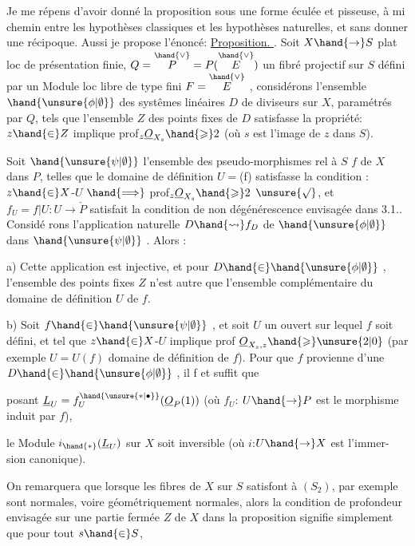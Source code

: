 \placedmargin{$|$}
Je me répens d'avoir donné la proposition  sous une forme éculée et
pisseuse, à mi chemin entre  les hypothèses classiques et les hypothèses
naturelles, et sans donner une récipoque. Aussi je propose l'énoncé:
\uline{Proposition. }.  Soit $X \hand{\to} S$ plat loc de présentation
finie,  $Q=\overset{\hand{\vee}}{P} = P(\overset{\hand{\vee}}{E})$  un fibré  projectif sur $S$ défini par
un Module loc  libre de type fini $F = \overset{\hand{\vee}}{E}$ ,  considérons l'ensemble
$\hand{\unsure{\phi|\emptyset}}$  des systêmes linéaires $D$  de diviseurs  sur $X$, paramétrés par $Q$, tels
que l'ensemble  $Z$ des points fixes de $D$  satisfasse la propriété: $z \hand{\in} Z$
implique prof$_z \underline{O}_{X_s} \hand{\geqslant} 2$  (où  $s$  est l'image de $z$ dans $S$). 

  Soit $\hand{\unsure{\psi|\emptyset}}$ l'ensemble des  pseudo-morphismes rel à
$S$ $f$ de $X$ dans  $P$, telles que le domaine de définition $U=$(f)
 satisfasse la condition : $z \hand{\in} X$-$U$ $\hand{\Longrightarrow}$ prof$_z \underline{O}_{X_s} \hand{\geqslant} 2$ $\unsure{\surd}$, et $f_U = f|U : U \to \check{P}$ satisfait la condition de non dégénérescence envisagée dans 3.1.. Considé
rons l'application naturelle  $D \hand{\rightsquigarrow} f_D$  de $\hand{\unsure{\phi|\emptyset}}$  dans $\hand{\unsure{\psi|\emptyset}}$ .  Alors :

a)  Cette application est injective,  et  pour $D \hand{\in} \hand{\unsure{\phi|\emptyset}}$ , l'ensemble des
points fixes $Z$  n'est autre que l'ensemble  complémentaire du domaine de
définition  $U$ de $f$.

b)   Soit
$f \hand{\in} \hand{\unsure{\psi|\emptyset}}$ , et soit $U$ un ouvert sur lequel $f$ soit défini, et tel que $z \hand{\in} X$-$U$
implique prof $\underline{O}_{X_s,z} \hand{\geqslant} \unsure{2|0}$  (par exemple $U = U(f)$ domaine de
définition de $f$). Pour que $f$ provienne d'une $D \hand{\in} \hand{\unsure{\phi|\emptyset}}$ , il f et suffit  que\hand{\unsure{$\surd$}}

posant $\underline{L}_U = f_U^{\hand{\unsure{*|\bullet}}}(\underline{O}_P(1))$  (où  $f_U$: $U \hand{\to} P$  est le morphisme induit par $f$),

 le Module  $i_{\hand{*}}(\underline{L}_U)$  sur $X$ soit inversible (où $i$:$U \hand{\to} X$ est l'immer-%
sion canonique).

On remarquera que lorsque  les fibres de $X$ sur $S$ satisfont à $(S_2)$,
par exemple sont normales, voire géométriquement  normales, alors la
condition de profondeur  envisagée sur  une partie fermée $Z$ de $X$ dans 
la proposition  signifie simplement que pour tout $s \hand{\in} S$,

